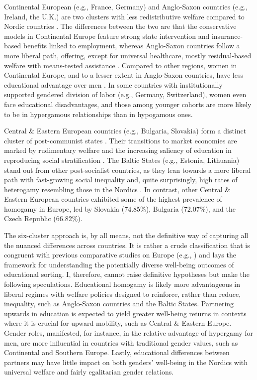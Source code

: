 Continental European (e.g., France, Germany) and Anglo-Saxon countries (e.g., Ireland, the U.K.) are two clusters with less redistributive welfare compared to Nordic countries \parencite{esping-andersenThreeWorldsWelfare1990,esping-andersenWelfareRegimesSocial2015}. The differences between the two are that the conservative models in Continental Europe feature strong state intervention and insurance-based benefits linked to employment, whereas Anglo-Saxon countries follow a more liberal path, offering, except for universal healthcare, mostly residual-based welfare with means-tested assistance \parencite{artsModelsWelfareState2010}. Compared to other regions, women in Continental Europe, and to a lesser extent in Anglo-Saxon countries, have less educational advantage over men \parencite{eratEducationalAssortativeMating2021}. In some countries with institutionally supported gendered division of labor (e.g., Germany, Switzerland), women even face educational disadvantages, and those among younger cohorts are more likely to be in hypergamous relationships than in hypogamous ones.

Central \& Eastern European countries (e.g., Bulgaria, Slovakia) form a distinct cluster of post-communist states \parencite{castlesWorldsFamiliesRegimes2008}. Their transitions to market economies are marked by rudimentary welfare and the increasing saliency of education in reproducing social stratification \parencite{fengerWelfareRegimesCentral2007,mullerEducationYouthIntegration2005}. The Baltic States (e.g., Estonia, Lithuania) stand out from other post-socialist countries, as they lean towards a more liberal path with fast-growing social inequality and, quite surprisingly, high rates of heterogamy resembling those in the Nordics \parencite{aidukaiteTransformationWelfareSystems2009}. In contrast, other Central \& Eastern European countries exhibited some of the highest prevalence of homogamy in Europe, led by Slovakia (74.85\%), Bulgaria (72.07\%), and the Czech Republic (66.82\%).

The six-cluster approach is, by all means, not the definitive way of capturing all the nuanced differences across countries. It is rather a crude classification that is congruent with previous comparative studies on Europe (e.g., \cite{castlesWorldsFamiliesRegimes2008,schuckDoesIntergenerationalEducational2018}) and lays the framework for understanding the potentially diverse well-being outcomes of educational sorting. I, therefore, cannot raise definitive hypotheses but make the following speculations. Educational homogamy is likely more advantageous in liberal regimes with welfare policies designed to reinforce, rather than reduce, inequality, such as Anglo-Saxon countries and the Baltic States. Partnering upwards in education is expected to yield greater well-being returns in contexts where it is crucial for upward mobility, such as Central \& Eastern Europe. Gender roles, manifested, for instance, in the relative advantage of hypergamy for men, are more influential in countries with traditional gender values, such as Continental and Southern Europe. Lastly, educational differences between partners may have little impact on both genders' well-being in the Nordics with universal welfare and fairly egalitarian gender relations.

